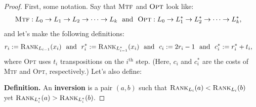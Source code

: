 \begin{proof}
    First, some notation.  Say that $\textsc{Mtf}$ and $\textsc{Opt}$ look like:
    \[ \textsc{Mtf}: L_0 \to L_1 \to L_2 \to \dots \to L_k ~ \text{ and } ~ \textsc{Opt}: L_0 \to L_1^* \to L_2^* \to \dots \to L_k^*, \]
    and let's make the following definitions:
    \[ r_i := \textsc{Rank}_{L_{i - 1}}(x_i) ~ \text{ and } ~ r_i^* := \textsc{Rank}_{L_{i - 1}^*}(x_i) ~ \text{ and } ~ c_i := 2r_i - 1 ~ \text{ and } ~ c_i^* := r_i^* + t_i, \]
    where \textsc{Opt} uses $t_i$ transpositions on the $i^{\text{th}}$ step.  (Here, $c_i$ and $c_i^*$ are the costs of \textsc{Mtf} and \textsc{Opt}, respectively.) Let's also define:

    \textbf{Definition.} An \textbf{inversion} is a pair $(a, b)$ such that $\textsc{Rank}_{L_i}(a) < \textsc{Rank}_{L_i}(b)$ yet $\textsc{Rank}_{L_i^*}(a) > \textsc{Rank}_{L_i^*}(b)$.


\end{proof}
